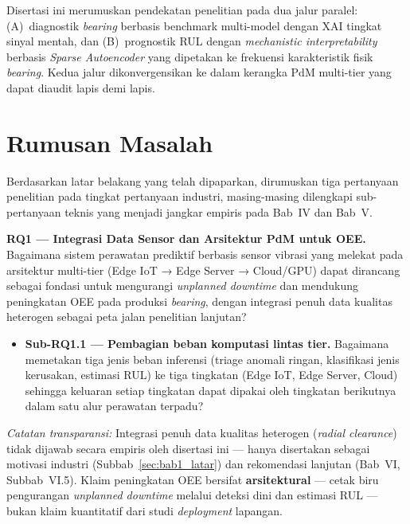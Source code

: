 Disertasi ini merumuskan pendekatan penelitian pada dua jalur paralel:
(A)~diagnostik \emph{bearing} berbasis benchmark multi-model dengan XAI
tingkat sinyal mentah, dan (B)~prognostik RUL dengan
\emph{mechanistic interpretability} berbasis \emph{Sparse Autoencoder}
yang dipetakan ke frekuensi karakteristik fisik \emph{bearing}.
Kedua jalur dikonvergensikan ke dalam kerangka PdM multi-tier yang
dapat diaudit lapis demi lapis.


\section{Rumusan Masalah}
\label{sec:bab1_rumusan}

Berdasarkan latar belakang yang telah dipaparkan, dirumuskan tiga
pertanyaan penelitian pada tingkat pertanyaan industri, masing-masing
dilengkapi sub-pertanyaan teknis yang menjadi jangkar empiris pada
Bab~IV dan Bab~V.

\textbf{RQ1 --- Integrasi Data Sensor dan Arsitektur PdM untuk OEE.}
Bagaimana sistem perawatan prediktif berbasis sensor vibrasi yang
melekat pada arsitektur multi-tier (Edge IoT → Edge Server → Cloud/GPU)
dapat dirancang sebagai fondasi untuk mengurangi \emph{unplanned
downtime} dan mendukung peningkatan OEE pada produksi \emph{bearing}, dengan
integrasi penuh data kualitas heterogen sebagai peta jalan penelitian
lanjutan?

\begin{itemize}
  \item \textbf{Sub-RQ1.1 — Pembagian beban komputasi lintas tier.}
        Bagaimana memetakan tiga jenis beban inferensi (triage anomali
        ringan, klasifikasi jenis kerusakan, estimasi RUL) ke tiga
        tingkatan (Edge IoT, Edge Server, Cloud) sehingga keluaran
        setiap tingkatan dapat dipakai oleh tingkatan berikutnya dalam
        satu alur perawatan terpadu?
\end{itemize}

\noindent\textit{Catatan transparansi:} Integrasi penuh data kualitas
heterogen (\emph{radial clearance}) tidak dijawab secara empiris oleh
disertasi ini --- hanya disertakan sebagai motivasi industri
(Subbab~\ref{sec:bab1_latar}) dan rekomendasi lanjutan (Bab~VI, Subbab~VI.5).
Klaim peningkatan OEE bersifat \textbf{arsitektural} --- cetak biru
pengurangan \emph{unplanned downtime} melalui deteksi dini dan estimasi
RUL --- bukan klaim kuantitatif dari studi \emph{deployment} lapangan.

\medskip

